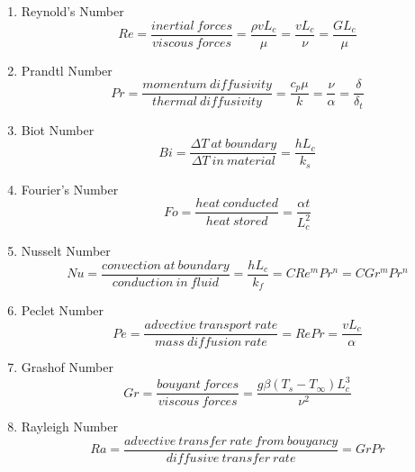 \documentclass{article}
\begin{document}
\begin{enumerate}
    \item Reynold's Number
    \begin{equation}
        Re = \frac{inertial\ forces}{viscous\ forces} = 
        \frac{\rho v L_c}{\mu} = 
        \frac{v L_c}{\nu} = 
        \frac{G L_c}{\mu}
    \end{equation}
    
    \item Prandtl Number
    \begin{equation}
        Pr = \frac{momentum\ diffusivity}{thermal\ diffusivity} =
        \frac{c_p \mu}{k} =
        \frac{\nu}{\alpha} =
        \frac{\delta}{\delta_t}
    \end{equation}

    \item Biot Number
    \begin{equation}
        Bi = \frac{\Delta T\ at\ boundary}{\Delta T\ in\ material} = 
        \frac{h L_c}{k_s}
    \end{equation}

    \item Fourier's Number
    \begin{equation}
        Fo = \frac{heat\ conducted}{heat\ stored} = 
        \frac{\alpha t}{L_c^2}
    \end{equation}

    \item Nusselt Number
    \begin{equation}
        Nu = \frac{convection\ at\ boundary}{conduction\ in\ fluid} = 
        \frac{h L_c}{k_f} =
        C Re^m Pr^n =
        C Gr^m Pr^n
    \end{equation}

    \item Peclet Number
    \begin{equation}
        Pe = \frac{advective\ transport\ rate}{mass\ diffusion\ rate} =
        RePr = 
        \frac{v L_c}{\alpha}
    \end{equation}

    \item Grashof Number
    \begin{equation}
        Gr = \frac{bouyant\ forces}{viscous\ forces} =
        \frac{g \beta \left(T_s - T_{\infty} \right) L_c^3}{\nu^2}
    \end{equation}

    \item Rayleigh Number
    \begin{equation}
        Ra = 
        \frac{advective\ transfer\ rate\ from\ bouyancy}{diffusive\ transfer\ rate} = 
        GrPr
    \end{equation}


\end{enumerate}
\end{document}
